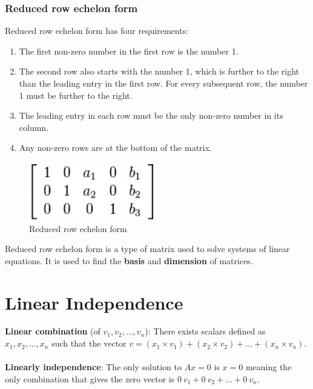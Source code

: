 \documentclass[10pt,a4paper]{article}
\begin{document}
\subsubsection{Reduced row echelon form}

Reduced row echelon form has four requirements:
\begin{enumerate}
    \item The first non-zero number in the first row is the number 1.
    \item The second row also starts with the number 1, which is further to the right than the leading entry in the first row. For every subsequent row, the number 1 must be further to the right.
    \item The leading entry in each row must be the only non-zero number in its column.
    \item Any non-zero rows are at the bottom of the matrix.
\end{enumerate}
\begin{figure} [h!]
    \centering
    \includegraphics[scale=0.7]{reduced row echelon form.JPG}
    \caption{Reduced row echelon form}
\end{figure}

Reduced row echelon form is a type of matrix used to solve systems of linear equations. It is used
to find the \textbf{basis} and \textbf{dimension} of matrices.

\section{Linear Independence}

\begin{tcolorbox}[breakable,colback=white]
    \textbf{Linear combination} (of $v_1, v_2,\dots,v_n$): There exists scalars defined as $x_1, x_2,\dots,x_n$
    such that the vector $v=(x_1 \times v_1)+(x_2 \times v_2)+\dots+(x_n \times v_n)$.
    \\
    \\
    \textbf{Linearly independence}: The only solution to $Ax=0$ is $x=0$ meaning the only
    combination that gives the zero vector is $0\:v_1 + 0\:v_2 + \dots + 0\:v_n$.
\end{tcolorbox}
\end{document}
